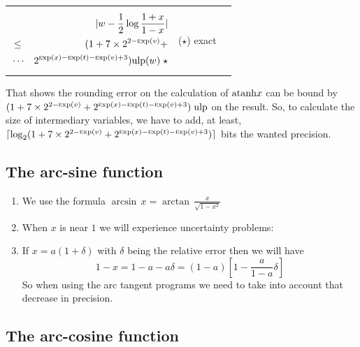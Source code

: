 \documentclass[12pt]{amsart}
\def\n{\textnormal}
\def\ulp{{\rm ulp}}
\def\Exp{{\rm \textsc exp}}
\begin{document}
\begin{center}
\begin{tabular}{l l l}
\begin{minipage}{7.5cm}
\begin{eqnarray}\nonumber
  &&|w-\frac{1}{2}\log{\frac{1+x}{1-x}}| \\\nonumber
  &       \leq& (1+7 \times 2^{2-\Exp(v)} + \\\nonumber
  &       \cdots&  2^{\Exp(x)-\Exp(t)-\Exp(v)+3}) \ulp(w) \;\star
\end{eqnarray}


\end{minipage} &
\begin{minipage}{6cm}

($\star$) exact


\end{minipage}
\end{tabular}
\end{center}

That shows the rounding error on the calculation of $\n{atanh} x$ can
be bound by $ (1+7 \times 2^{2-\Exp(v)} +
2^{\Exp(x)-\Exp(t)-\Exp(v)+3}) \; \ulp$ on the result. So, to
calculate the size of intermediary variables, we have to add, at
least, $\lceil \log_2 (1+7 \times 2^{2-\Exp(v)} +
2^{\Exp(x)-\Exp(t)-\Exp(v)+3}) \rceil$ bits the wanted precision.

\subsection{The arc-sine function}

\begin{enumerate}
\item We use the formula $\arcsin\,x=\arctan\,\frac{x}{\sqrt{1-x^2}}$
\item When $x$ is near $1$ we will experience uncertainty problems:
\item If $x=a(1+\delta)$ with $\delta$ being the relative error then we will have
\begin{equation*}
1-x=1-a-a\delta=(1-a)[1-\frac{a}{1-a}\delta]
\end{equation*}
So when using the arc tangent programs we need to take into account that decrease in precision.
\end{enumerate}

\subsection{The arc-cosine function} %
\end{document}
